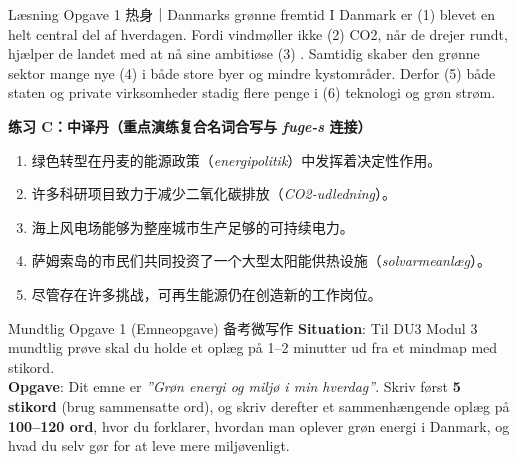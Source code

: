 \vspace{0.2em}
\begin{emailbox}{Læsning Opgave 1 热身｜Danmarks grønne fremtid}
I Danmark er (1) \underline{\hspace{2.4cm}} blevet en helt central del af hverdagen. Fordi vindmøller ikke (2) \underline{\hspace{2.4cm}} CO2, når de drejer rundt, hjælper de landet med at nå sine ambitiøse (3) \underline{\hspace{2.4cm}}. Samtidig skaber den grønne sektor mange nye (4) \underline{\hspace{2.4cm}} i både store byer og mindre kystområder. Derfor (5) \underline{\hspace{2.4cm}} både staten og private virksomheder stadig flere penge i (6) \underline{\hspace{2.4cm}} teknologi og grøn strøm.
\end{emailbox}

\textbf{练习 C：中译丹（重点演练复合名词合写与 \textit{fuge-s} 连接）}
\begin{enumerate}
  \item 绿色转型在丹麦的能源政策（\textit{energipolitik}）中发挥着决定性作用。
  \item 许多科研项目致力于减少二氧化碳排放（\textit{CO2-udledning}）。
  \item 海上风电场能够为整座城市生产足够的可持续电力。
  \item 萨姆索岛的市民们共同投资了一个大型太阳能供热设施（\textit{solvarmeanlæg}）。
  \item 尽管存在许多挑战，可再生能源仍在创造新的工作岗位。
\end{enumerate}


\begin{emailbox}{Mundtlig Opgave 1 (Emneopgave) 备考微写作}
\textbf{Situation}: Til DU3 Modul 3 mundtlig prøve skal du holde et oplæg på 1--2 minutter ud fra et mindmap med stikord.\\
\textbf{Opgave}: Dit emne er \textit{”Grøn energi og miljø i min hverdag”}. Skriv først \textbf{5 stikord} (brug sammensatte ord), og skriv derefter et sammenhængende oplæg på \textbf{100--120 ord}, hvor du forklarer, hvordan man oplever grøn energi i Danmark, og hvad du selv gør for at leve mere miljøvenligt.
\end{emailbox}

